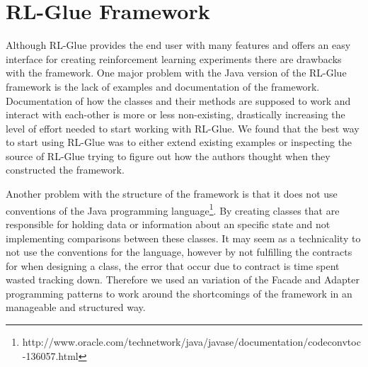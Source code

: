 \section{RL-Glue Framework}
\label{ap:eval_glue}
Although RL-Glue provides the end user with many features and offers an easy interface for creating reinforcement learning experiments there are drawbacks with the framework. One major problem with the Java version of the RL-Glue framework is the lack of examples and documentation of the framework. Documentation of how the classes and their methods are supposed to work and interact with each-other is more or less non-existing, drastically increasing the level of effort needed to start  working with RL-Glue. We found that the best way to start using RL-Glue was to either extend existing examples or inspecting the source of RL-Glue trying to figure out how the authors thought when they constructed the framework.

Another problem with the structure of the framework is that it does not use conventions of the Java programming language\footnote{http://www.oracle.com/technetwork/java/javase/documentation/codeconvtoc-136057.html}. By creating classes that are responsible for holding data or information about an specific state and not implementing comparisons between these classes. It may seem as a technicality to not use the conventions for the language, however by not fulfilling the contracts for when designing a class, the error that occur due to contract is time spent wasted tracking down. Therefore we used an variation of the Facade and Adapter programming patterns \parencite{gamme1994designpatterns} to work around the shortcomings of the framework in an manageable and structured way.